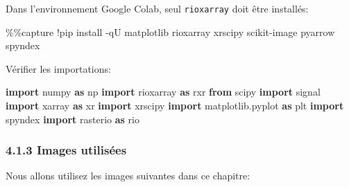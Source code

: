 \documentclass[
]{article}
\newenvironment{Shaded}{}{}
\newcommand{\ImportTok}[1]{\textcolor[rgb]{0.00,0.50,0.00}{\textbf{#1}}}
\newcommand{\NormalTok}[1]{#1}
\newcommand{\OperatorTok}[1]{\textcolor[rgb]{0.40,0.40,0.40}{#1}}
\begin{document}
Dans l'environnement Google Colab, seul \texttt{rioxarray} doit être
installés:

\label{23b5688b}
\label{cb1}
\begin{Shaded}
\begin{Highlighting}[]
\OperatorTok{\%\%}\NormalTok{capture}
\OperatorTok{!}\NormalTok{pip install }\OperatorTok{{-}}\NormalTok{qU matplotlib rioxarray xrscipy scikit}\OperatorTok{{-}}\NormalTok{image pyarrow spyndex}
\end{Highlighting}
\end{Shaded}

Vérifier les importations:

\label{64a03d08}
\label{cb2}
\begin{Shaded}
\begin{Highlighting}[]
\ImportTok{import}\NormalTok{ numpy }\ImportTok{as}\NormalTok{ np}
\ImportTok{import}\NormalTok{ rioxarray }\ImportTok{as}\NormalTok{ rxr}
\ImportTok{from}\NormalTok{ scipy }\ImportTok{import}\NormalTok{ signal}
\ImportTok{import}\NormalTok{ xarray }\ImportTok{as}\NormalTok{ xr}
\ImportTok{import}\NormalTok{ xrscipy}
\ImportTok{import}\NormalTok{ matplotlib.pyplot }\ImportTok{as}\NormalTok{ plt}
\ImportTok{import}\NormalTok{ spyndex}
\ImportTok{import}\NormalTok{ rasterio }\ImportTok{as}\NormalTok{ rio}
\end{Highlighting}
\end{Shaded}

\subsubsection{\texorpdfstring{{4.1.3} Images
utilisées}{4.1.3 Images utilisées}}\label{images-utilisuxe9es}

Nous allons utilisez les images suivantes dans ce chapitre:
\end{document}
